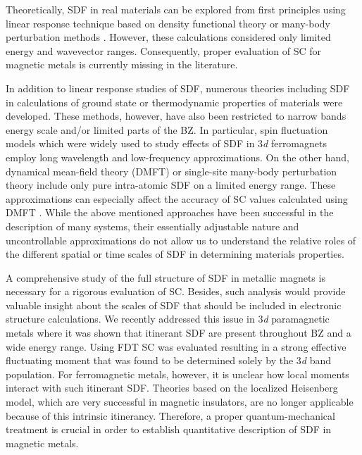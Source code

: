 Theoretically, SDF in real materials can be explored from first principles using linear response technique based on density functional theory\citep{Savrasov,Staunton,Costa,Buczek,Bergara,Lounis} or many-body perturbation methods \citep{Blugel,Schilfgaarde}. However, these calculations considered only limited energy and wavevector ranges. Consequently, proper evaluation of SC for magnetic metals is currently missing in the literature.

In addition to linear response studies of SDF, numerous theories including SDF in calculations of ground state or thermodynamic properties of materials were developed. These methods, however, have also been restricted to narrow bands energy scale and/or limited parts of the BZ. In particular, spin fluctuation models which were widely used to study effects of SDF in 3\emph{d} ferromagnets\citep{Shimizu,Lonzarich,Solontsov,SolontsovBook,Solontsov2,Antropov} employ long wavelength and low-frequency approximations. On the other hand, dynamical mean-field theory\citep{Kotliar} (DMFT) or single-site many-body perturbation theory\citep{Zein} include only pure intra-atomic SDF on a limited energy range. These approximations can especially affect the accuracy of SC values calculated using DMFT \citep{Lichtenstein,Yin,Igoshev}. While the above mentioned approaches have been successful in the description of many systems, their essentially adjustable nature and uncontrollable approximations do not allow us to understand the relative roles of the different spatial or time scales of SDF in determining materials properties.

A comprehensive study of the full structure of SDF in metallic magnets is necessary for a rigorous evaluation of SC. Besides, such analysis would provide valuable insight about the scales of SDF that should be included in electronic structure calculations. We recently addressed this issue in 3\emph{d} paramagnetic metals\citep{Wysocki} where it was shown that itinerant SDF are present throughout BZ and a wide energy range. Using FDT SC was evaluated resulting in a strong effective fluctuating moment that was found to be determined solely by the 3\emph{d} band population. For ferromagnetic metals, however, it is unclear how local moments interact with such itinerant SDF. Theories based on the localized Heisenberg model, which are very successful in magnetic insulators, are no longer applicable because of this intrinsic itinerancy. Therefore, a proper quantum-mechanical treatment is crucial in order to establish quantitative description of SDF in magnetic metals.


